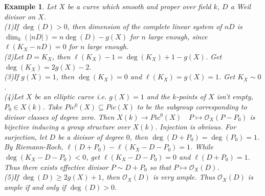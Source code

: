 \documentclass{ctexart}
\newtheorem{example}{Example}[section]
\begin{document}
\begin{example}
    Let $X$ be a curve which smooth and proper over field $k$, $D$ a Weil divisor on $X$. \\
    (1)If $\deg(D) > 0$, then dimension of the complete linear system of $nD$ is $\dim_{k}(|nD|) = n\deg(D) - g(X)$ for $n$ large enough,
    since $\ell(K_{X} - nD) = 0$ for $n$ large enough. \\
    (2)Let $D = K_{X}$, then $\ell(K_{X}) - 1 = \deg(K_{X}) + 1 - g(X)$.
    Get $\deg(K_{X}) = 2g(X) - 2$. \\
    (3)If $g(X) = 1$, then $\deg(K_{X}) = 0$ and $\ell(K_{X}) = g(X) = 1$.
    Get $K_{X} \sim 0$. \\
    (4)Let $X$ be an elliptic curve i.e. $g(X) = 1$ and the $k$-points of $X$ isn't empty, $P_{0}\in X(k)$.
    Take $Pic^{0}(X) \subseteq Pic(X)$ to be the subgroup corresponding to divisor classes of degree zero.
    Then $X(k) \longrightarrow Pic^{0}(X)\quad P \longmapsto \mathcal{O}_{X}(P - P_{0})$ is bijective inducing a group structure over $X(k)$.
    Injection is obvious.
    For surjection, let $D$ be a divisor of degree $0$, then $\deg(D + P_{0}) = \deg(P_{0}) = 1$.
    By Riemann-Roch, $\ell(D + P_{0}) - \ell(K_{X} - D - P_{0}) = 1$.
    While $\deg(K_{X} - D - P_{0}) < 0$, get $\ell(K_{X} - D - P_{0}) = 0$ and $\ell(D + P_{0}) = 1$.
    Thus there exists effective divisor $P \sim D + P_{0}$ so that $P \longmapsto \mathcal{O}_{X}(D)$. \\
    (5)If $\deg(D) \ge 2g(X) + 1$, then $\mathcal{O}_{X}(D)$ is very ample.
    Thus $\mathcal{O}_{X}(D)$ is ample if and only if $\deg(D) > 0$.
\end{example}
\end{document}
